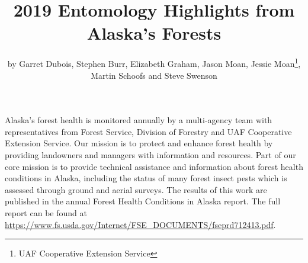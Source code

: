 ﻿\title{2019 Entomology Highlights from Alaska’s Forests}

\subtitle{}

\author{by Garret Dubois, Stephen Burr, Elizabeth Graham, Jason Moan, Jessie Moan\footnote{UAF Cooperative Extension Service}, Martin Schoofs and Steve Swenson}

\maketitle

Alaska’s forest health is monitored annually by a multi-agency team with representatives from  Forest Service,  Division of Forestry and UAF Cooperative Extension Service. Our mission is to protect and enhance forest health by providing landowners and managers with information and resources. Part of our core mission is to provide technical assistance and information about forest health conditions in Alaska, including the status of many forest insect pests which is assessed through ground and aerial surveys. The results of this work are published in the annual Forest Health Conditions in Alaska report. The full report can be found at \url{https://www.fs.usda.gov/Internet/FSE_DOCUMENTS/fseprd712413.pdf}. 

